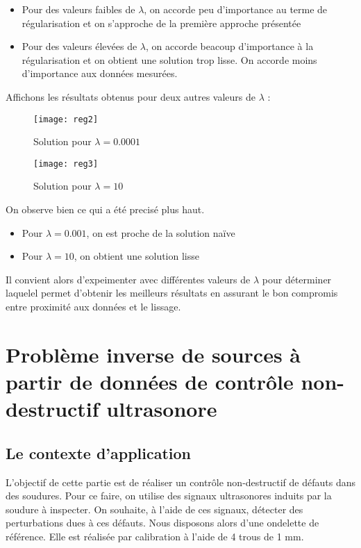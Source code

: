 \documentclass[12pt,a4paper,titlepage]{scrartcl}
\begin{document}
\begin{itemize}
    \item{Pour des valeurs faibles de $\lambda$, on accorde peu d'importance au terme de
        régularisation et on s'approche de la première approche présentée}
    \item{Pour des valeurs élevées de $\lambda$, on accorde beacoup d'importance à la
        régularisation et on obtient une solution trop lisse. On accorde moins d'importance
        aux données mesurées.}
\end{itemize}

Affichons les résultats obtenus pour deux autres valeurs de $\lambda$ :

\begin{figure}[H]
    \caption{Solution pour $\lambda = 0.0001$}
    \texttt{[image: reg2]}
    \centering
\end{figure}

\begin{figure}[H]
    \caption{Solution pour $\lambda = 10$}
    \texttt{[image: reg3]}
    \centering
\end{figure}

On observe bien ce qui a été precisé plus haut.

\begin{itemize}
    \item{Pour $\lambda = 0.001$, on est proche de la solution naïve}
    \item{Pour $\lambda = 10$, on obtient une solution lisse}
\end{itemize}

Il convient alors d'expeimenter avec différentes valeurs de $\lambda$ pour déterminer
laquelel permet d'obtenir les meilleurs résultats en assurant le bon compromis entre
proximité aux données et le lissage.

\pagebreak

\section{Problème inverse de sources à partir de données de contrôle
non-destructif ultrasonore}

\subsection{Le contexte d'application}

L'objectif de cette partie est de réaliser un contrôle non-destructif
de défauts dans des soudures. Pour ce faire, on utilise des signaux
ultrasonores induits par la soudure à inspecter.
On souhaite, à l'aide de ces signaux, détecter des perturbations dues
à ces défauts. Nous disposons alors d'une ondelette de
référence. Elle est réalisée par calibration à l'aide de 4 trous de
1 mm.
\end{document}
